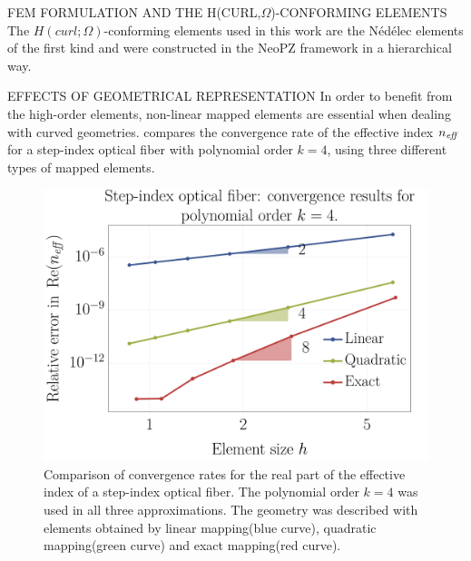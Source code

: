 \documentclass[debug]{beamer} %
\newcommand{\hcurl}[1]{H (curl;#1)}
\begin{document}
\begin{frame}
\begin{minipage}[t]{0.45\textwidth}
\begin{block}{\boxnumber FEM FORMULATION AND THE \texorpdfstring{H(CURL,$\Omega$)}{H(CURL,OMEGA)}-CONFORMING ELEMENTS}
			The $\hcurl{\Omega}$-conforming elements used in this work are the Nédélec elements of the first kind \textcite{nedelec80} and were constructed in the NeoPZ framework in a hierarchical way.
        \end{block}

        \vfill
        \begin{block}{\boxnumber EFFECTS OF GEOMETRICAL REPRESENTATION}
        	In order to benefit from the high-order elements, non-linear mapped elements are essential when dealing with curved geometries.  compares the convergence rate of the effective index $n_{\text{\emph{eff}}}$ for a step-index optical fiber with polynomial order $k=4$, using three different types of mapped elements.


        	\begin{figure}[ht]
	            \centering
	            \includegraphics[width=0.7\linewidth]{images/convergenceRates_k4_poster.png}
	            \caption{Comparison of convergence rates for the real part of the effective index of a step-index optical fiber. The polynomial order $k=4$ was used in all three approximations. The geometry was described with elements obtained by linear mapping(blue curve), quadratic mapping(green curve) and exact mapping(red curve).}
	            \label{fig:convergence-step}
        	\end{figure}
        

\end{block}
\end{minipage}
\end{frame}
\end{document}
